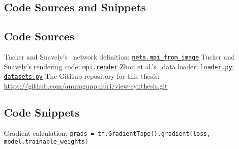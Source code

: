 \begin{appendices}
\chapter{Code Sources and Snippets}\label{app:code-sources-snippets}

\section{Code Sources}\label{sec:code-sources}

\begin{outline}
    \1 Tucker and Snavely's~\cite{single_view_mpi} network definition: \href{https://github.com/google-research/google-research/blob/ea313c6e96acce6c863de41615c6cf4079b8ca94/single_view_mpi/libs/nets.py#L146}{\texttt{nets.mpi\_from\_image}}
    \1 Tucker and Snavely's rendering code: \href{https://github.com/google-research/google-research/blob/ea313c6e96acce6c863de41615c6cf4079b8ca94/single_view_mpi/libs/mpi.py#L232}{\texttt{mpi.render}}
    \1 Zhou et al.'s~\cite{zhou2018stereo} data loader: \href{https://github.com/google/stereo-magnification/blob/f2041f80ed8c340173a6048375ba900201c1f1e7/stereomag/loader.py}{\texttt{loader.py}}; \href{https://github.com/google/stereo-magnification/blob/f2041f80ed8c340173a6048375ba900201c1f1e7/stereomag/datasets.py}{\texttt{datasets.py}}
    \1 The GitHub repository for this thesis: \url{https://github.com/anuraguppuluri/view-synthesis.git}
\end{outline}

\section{Code Snippets}\label{sec:code-snippets}

\begin{outline}
    \1 Gradient calculation:
        \2 \texttt{grads = tf.GradientTape().gradient(loss,}
        \2 \texttt{model.trainable\_weights)}
\end{outline}

\end{appendices}